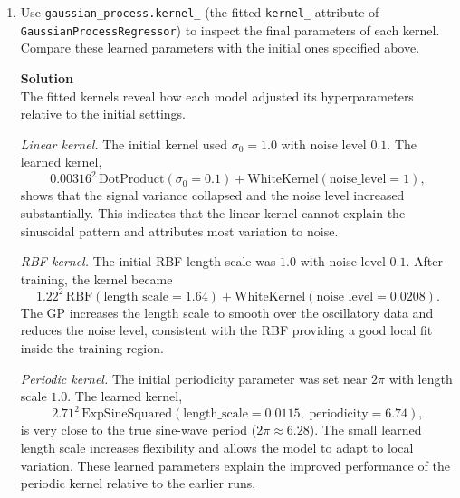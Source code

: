 \documentclass[11pt]{article}
\begin{document}
\begin{enumerate}[label=\textbf{8.1 (\alph*)}, leftmargin=1.4cm]
		The \emph{Exp-Sine-Squared} kernel should in principle recover the full
		periodic structure of the sine wave. In our results, however, the model
		does not provide a reasonable fit: the predictions inside the training
		interval are unstable and the extrapolation again collapses to zero. The
		fitted periodicity and length–scale parameters take unrealistic values,
		indicating that the optimizer became trapped in a poor local minimum. As
		suggested in the assignment, additional optimizer restarts or tighter
		hyperparameter bounds are required for this kernel to perform properly.
		
		In summary: the linear kernel fails entirely, the RBF kernel interpolates
		well but cannot extrapolate periodic behavior, and the periodic kernel
		fails due to poor hyperparameter optimization rather than a limitation
		of the kernel itself.
		
		\item Use \texttt{gaussian\_process.kernel\_} (the fitted \texttt{kernel\_} attribute of \texttt{GaussianProcessRegressor}) to inspect the final parameters of each kernel. Compare these learned parameters with the initial ones specified above.
		
		\noindent\textbf{Solution}\\
		The fitted kernels reveal how each model adjusted its hyperparameters
		relative to the initial settings.
		
		\medskip
		\noindent\emph{Linear kernel.}
		The initial kernel used $\sigma_0 = 1.0$ with noise level $0.1$. The
		learned kernel,
		\[
		0.00316^{2}\,\text{DotProduct}(\sigma_0 = 0.1)
		+ \text{WhiteKernel}(\text{noise\_level} = 1),
		\]
		shows that the signal variance collapsed and the noise level increased
		substantially. This indicates that the linear kernel cannot explain the
		sinusoidal pattern and attributes most variation to noise.
		
		\medskip
		\noindent\emph{RBF kernel.}
		The initial RBF length scale was $1.0$ with noise level $0.1$. After
		training, the kernel became
		\[
		1.22^{2}\,\text{RBF}(\text{length\_scale} = 1.64)
		+ \text{WhiteKernel}(\text{noise\_level} = 0.0208).
		\]
		The GP increases the length scale to smooth over the oscillatory data
		and reduces the noise level, consistent with the RBF providing a good
		local fit inside the training region.
		
		\medskip
		\noindent\emph{Periodic kernel.}
		The initial periodicity parameter was set near $2\pi$ with length scale
		$1.0$. The learned kernel,
		\[
		2.71^{2}\,\text{ExpSineSquared}(
		\text{length\_scale} = 0.0115,\;
		\text{periodicity} = 6.74),
		\]
		is very close to the true sine-wave period ($2\pi \approx 6.28$). The
		small learned length scale increases flexibility and allows the model to
		adapt to local variation. These learned parameters explain the improved
		performance of the periodic kernel relative to the earlier runs.
		

\end{enumerate}
\end{document}
